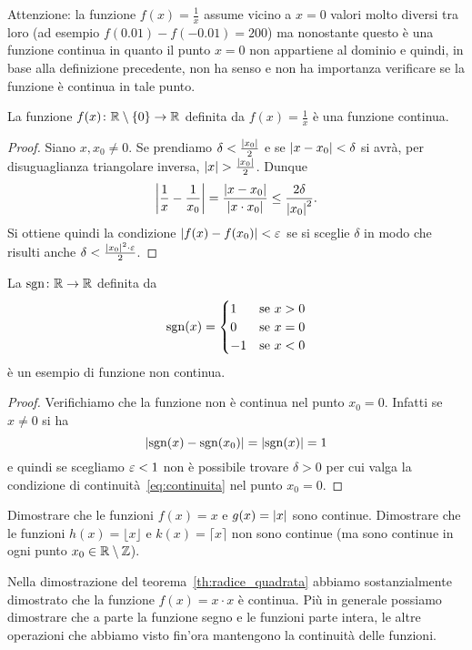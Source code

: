 Attenzione: la funzione $f(x)=\frac{1}{x}$
assume vicino a $x=0$ valori molto diversi tra loro (ad esempio $f(0.01)-f(-0.01)=200$)
ma nonostante questo è una funzione continua in quanto il punto
$x=0$ non appartiene al dominio e quindi,
in base alla definizione precedente, non ha senso e non ha importanza
verificare se la funzione è continua in tale punto.

\begin{theorem}
\label{th:cont_reciproco}%
La funzione $f(x)\colon \mathbb R\setminus{\left\{ 0 \right\}}\to \mathbb R$ definita
da $f(x)=\frac 1 x$ è una funzione continua.
\end{theorem}
%
\begin{proof}
Siano $x,x_0\neq 0$.
Se prendiamo $\delta < \frac{{\left|x_0\right|}}2$
e se ${\left|x-x_0\right|} < \delta$ si avrà,
per disuguaglianza triangolare inversa,
${\left|x\right|} > \frac{{\left|x_0\right|}}2$. Dunque
\[
{\left|\frac 1 x - \frac 1 {x_0}\right|}
= \frac{{\left|x-x_0\right|}}{{\left|x\cdot x_0\right|}}
\le \frac{2\delta}{{\left|x_0\right|}^2}.
\]
Si ottiene quindi la condizione ${\left|f(x)-f(x_0)\right|}<\varepsilon$
se si sceglie $\delta$ in modo che
risulti anche $\delta < \frac{{\left|x_0\right|}^2\cdot \varepsilon}{2}$.
\end{proof}

\begin{example}
La  $\operatorname{sgn}\colon \mathbb R \to \mathbb R$ definita da
\[
  \operatorname{sgn}(x) = \begin{cases}
  1 & \text{se $x> 0$}\\
  0 & \text{se $x=0$}\\
  -1 & \text{se $x<0$}
  \end{cases}
\]
è un esempio di funzione non continua.
\end{example}
%
\begin{proof}
Verifichiamo che la funzione non è continua
nel punto $x_0=0$.
Infatti se $x\neq 0$ si ha
\[
{\left|\operatorname{sgn}(x)-\operatorname{sgn}(x_0)\right|} = {\left|\operatorname{sgn}(x)\right|} = 1
\]
e quindi se scegliamo $\varepsilon<1$ non è possibile
trovare $\delta>0$ per cui valga la condizione
di continuità~\eqref{eq:continuita}
nel punto $x_0=0$.
\end{proof}

\begin{exercise}
Dimostrare che le funzioni $f(x) = x$ e $g(x)={\left|x\right|}$ sono continue.
Dimostrare che le funzioni $h(x) = \lfloor x\rfloor$ e $k(x)=\lceil x \rceil$
non sono continue (ma sono continue in ogni punto
$x_0\in \mathbb R \setminus \mathbb Z$).
\end{exercise}

Nella dimostrazione del teorema~\ref{th:radice_quadrata}
abbiamo sostanzialmente dimostrato che la funzione
$f(x)=x\cdot x$ è continua.
Più in generale possiamo dimostrare che
a parte la funzione segno e le funzioni parte intera,
le altre operazioni che abbiamo visto fin'ora
mantengono la continuità delle funzioni.


